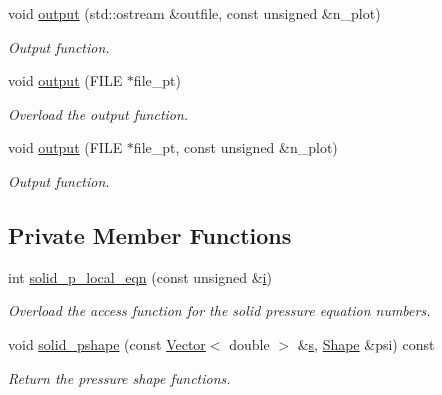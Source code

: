 \begin{DoxyCompactItemize}
void \hyperlink{classoomph_1_1AxisymQPVDElementWithPressure_aa7bf745c0767590c36a761d3a6399e57}{output} (std\+::ostream \&outfile, const unsigned \&n\+\_\+plot)
\begin{DoxyCompactList}\small\item\em Output function. \end{DoxyCompactList}\item 
void \hyperlink{classoomph_1_1AxisymQPVDElementWithPressure_a8f09df5914ea8dbb6ba7041bd6be15bd}{output} (F\+I\+LE $\ast$file\+\_\+pt)
\begin{DoxyCompactList}\small\item\em Overload the output function. \end{DoxyCompactList}\item 
void \hyperlink{classoomph_1_1AxisymQPVDElementWithPressure_a273e1cfc1185192fcb9cc3812360c87e}{output} (F\+I\+LE $\ast$file\+\_\+pt, const unsigned \&n\+\_\+plot)
\begin{DoxyCompactList}\small\item\em Output function. \end{DoxyCompactList}\end{DoxyCompactItemize}
\subsection*{Private Member Functions}
\begin{DoxyCompactItemize}
\item 
int \hyperlink{classoomph_1_1AxisymQPVDElementWithPressure_a8c9fa9511418570fab627362609235d0}{solid\+\_\+p\+\_\+local\+\_\+eqn} (const unsigned \&\hyperlink{cfortran_8h_adb50e893b86b3e55e751a42eab3cba82}{i})
\begin{DoxyCompactList}\small\item\em Overload the access function for the solid pressure equation numbers. \end{DoxyCompactList}\item 
void \hyperlink{classoomph_1_1AxisymQPVDElementWithPressure_acc96f08aadc9568d283dbe09ce06d643}{solid\+\_\+pshape} (const \hyperlink{classoomph_1_1Vector}{Vector}$<$ double $>$ \&\hyperlink{cfortran_8h_ab7123126e4885ef647dd9c6e3807a21c}{s}, \hyperlink{classoomph_1_1Shape}{Shape} \&psi) const
\begin{DoxyCompactList}\small\item\em Return the pressure shape functions. \end{DoxyCompactList}\end{DoxyCompactItemize}
